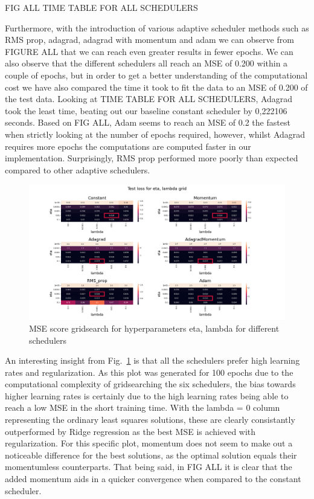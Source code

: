 \documentclass[onecolumn,10pt,cleanfoot]{asme2ej}
\begin{document}
FIG ALL
TIME TABLE FOR ALL SCHEDULERS

Furthermore, with the introduction of various adaptive scheduler methods such as RMS prop, adagrad, adagrad with momentum and adam we can observe from FIGURE ALL that we can reach even greater results in fewer epochs. We can also observe that the different schedulers all reach an MSE of 0.200 within a couple of epochs, but in order to get a better understanding of the computational cost we have also compared the time it took to fit the data to an MSE of 0.200 of the test data. Looking at TIME TABLE FOR ALL SCHEDULERS, Adagrad took the least time, beating out our baseline constant scheduler by 0,222106 seconds. Based on FIG ALL, Adam seems to reach an MSE of 0.2 the fastest when strictly looking at the number of epochs required, however, whilst Adagrad requires more epochs the computations are computed faster in our implementation. Surprisingly, RMS prop performed more poorly than expected compared to other adaptive schedulers.

\begin{figure}[h]
\centerline{\includegraphics[width=5in]{figure/100e_gridsearch.png}}
\caption{MSE score gridsearch for hyperparameters eta, lambda for different schedulers}
\label{heatmap}
\end{figure}

An interesting insight from Fig.~\ref{heatmap} is that all the schedulers prefer high learning rates and regularization. As this plot was generated for 100 epochs due to the computational complexity of gridsearching the six schedulers, the bias towards higher learning rates is certainly due to the high learning rates being able to reach a low MSE in the short training time. With the lambda = 0 column representing the ordinary least squares solutions, these are clearly consistantly outperformed by Ridge regression as the best MSE is achieved with regularization. For this specific plot, momentum does not seem to make out a noticeable difference for the best solutions, as the optimal solution equals their momentumless counterparts. That being said, in FIG ALL it is clear that the added momentum aids in a quicker convergence when compared to the constant scheduler.
\end{document}
